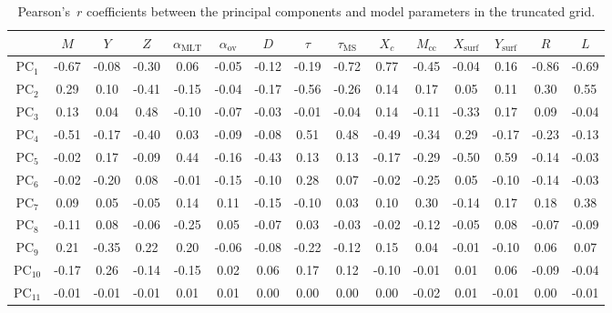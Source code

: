 {\begin{landscape}
\begin{table} %
\centering
\caption{Pearson's~$r$ coefficients between the principal components and model parameters in the truncated grid.}
\label{tab:mcoefs}
\hspace*{-0.5cm}
\begin{tabular}{c|cccccccccccccc}
    &$M$   & $Y$         & $Z$         & $\alpha_{\text{MLT}}$     & $\alpha_{\text{ov}}$ & $D$ & $\tau$      & $\tau_{\text{MS}}$     & $X_c$      & $M_{\text{cc}}$  & $X_{\text{surf}}$   & $Y_{\text{surf}}$   & $R$    & $L$                  \\ \hline \hline
PC$_1$  & -0.67 & -0.08 & -0.30 & 0.06      & -0.05     & -0.12 & -0.19 & -0.72 & 0.77     & -0.45   & -0.04   & 0.16   & -0.86 & -0.69 \\
PC$_2$  & 0.29  & 0.10  & -0.41 & -0.15     & -0.04     & -0.17 & -0.56 & -0.26 & 0.14     & 0.17    & 0.05    & 0.11   & 0.30  & 0.55  \\
PC$_3$  & 0.13  & 0.04  & 0.48  & -0.10     & -0.07     & -0.03 & -0.01 & -0.04 & 0.14     & -0.11   & -0.33   & 0.17   & 0.09  & -0.04 \\
PC$_4$  & -0.51 & -0.17 & -0.40 & 0.03      & -0.09     & -0.08 & 0.51  & 0.48  & -0.49    & -0.34   & 0.29    & -0.17  & -0.23 & -0.13 \\
PC$_5$  & -0.02 & 0.17  & -0.09 & 0.44      & -0.16     & -0.43 & 0.13  & 0.13  & -0.17    & -0.29   & -0.50   & 0.59   & -0.14 & -0.03 \\
PC$_6$  & -0.02 & -0.20 & 0.08  & -0.01     & -0.15     & -0.10 & 0.28  & 0.07  & -0.02    & -0.25   & 0.05    & -0.10  & -0.14 & -0.03 \\
PC$_7$  & 0.09  & 0.05  & -0.05 & 0.14      & 0.11      & -0.15 & -0.10 & 0.03  & 0.10     & 0.30    & -0.14   & 0.17   & 0.18  & 0.38  \\
PC$_8$  & -0.11 & 0.08  & -0.06 & -0.25     & 0.05      & -0.07 & 0.03  & -0.03 & -0.02    & -0.12   & -0.05   & 0.08   & -0.07 & -0.09 \\
PC$_9$  & 0.21  & -0.35 & 0.22  & 0.20      & -0.06     & -0.08 & -0.22 & -0.12 & 0.15     & 0.04    & -0.01   & -0.10  & 0.06  & 0.07  \\
PC$_{10}$ & -0.17 & 0.26  & -0.14 & -0.15     & 0.02      & 0.06  & 0.17  & 0.12  & -0.10    & -0.01   & 0.01    & 0.06   & -0.09 & -0.04 \\
PC$_{11}$ & -0.01 & -0.01 & -0.01 & 0.01      & 0.01      & 0.00  & 0.00  & 0.00  & 0.00     & -0.02   & 0.01    & -0.01  & 0.00  & -0.01 \\ \hline
\end{tabular} 
\end{table}
\end{landscape}
}


